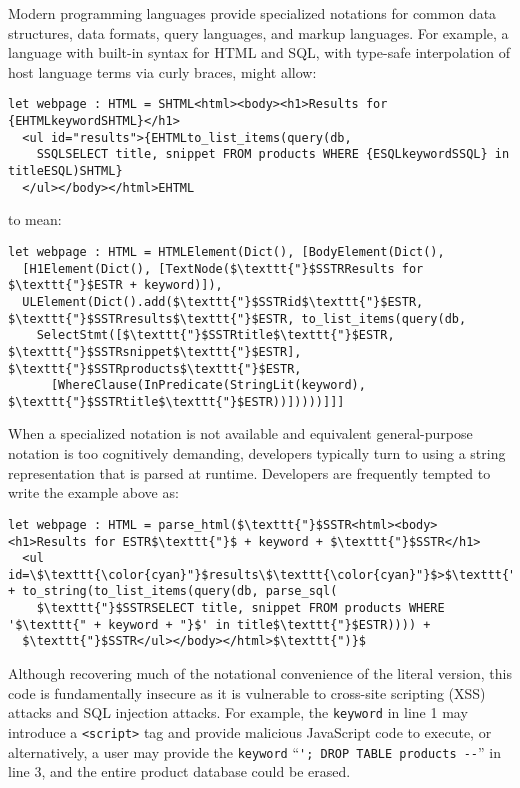 \documentclass{sig-alternate}
\let\li\lstinline
\begin{document}
Modern programming languages  provide specialized notations for common data structures, data formats, query languages, and markup languages. For example, a language with built-in syntax for HTML and SQL, with type-safe interpolation of host language terms via curly braces, might allow:

\begin{lstlisting}
let webpage : HTML = SHTML<html><body><h1>Results for {EHTMLkeywordSHTML}</h1>
  <ul id="results">{EHTMLto_list_items(query(db, 
    SSQLSELECT title, snippet FROM products WHERE {ESQLkeywordSSQL} in titleESQL)SHTML}
  </ul></body></html>EHTML
\end{lstlisting}

to mean:

\begin{lstlisting}
let webpage : HTML = HTMLElement(Dict(), [BodyElement(Dict(),
  [H1Element(Dict(), [TextNode($\texttt{"}$SSTRResults for $\texttt{"}$ESTR + keyword)]), 
  ULElement(Dict().add($\texttt{"}$SSTRid$\texttt{"}$ESTR, $\texttt{"}$SSTRresults$\texttt{"}$ESTR, to_list_items(query(db, 
    SelectStmt([$\texttt{"}$SSTRtitle$\texttt{"}$ESTR, $\texttt{"}$SSTRsnippet$\texttt{"}$ESTR], $\texttt{"}$SSTRproducts$\texttt{"}$ESTR, 
      [WhereClause(InPredicate(StringLit(keyword), $\texttt{"}$SSTRtitle$\texttt{"}$ESTR))]))))]]]
\end{lstlisting}

When a specialized notation is not available and equivalent general-purpose notation is too cognitively demanding, developers typically turn to using a string representation that is parsed at runtime. Developers are frequently  tempted to write the example above as:

\begin{lstlisting}
let webpage : HTML = parse_html($\texttt{"}$SSTR<html><body><h1>Results for ESTR$\texttt{"}$ + keyword + $\texttt{"}$SSTR</h1>
  <ul id=\$\texttt{\color{cyan}"}$results\$\texttt{\color{cyan}"}$>$\texttt{"}$ESTR + to_string(to_list_items(query(db, parse_sql(
  	$\texttt{"}$SSTRSELECT title, snippet FROM products WHERE '$\texttt{" + keyword + "}$' in title$\texttt{"}$ESTR)))) + 
  $\texttt{"}$SSTR</ul></body></html>$\texttt{")}$
\end{lstlisting}

Although recovering much of the notational convenience of the literal version, this code is fundamentally insecure as it is vulnerable to cross-site scripting (XSS) attacks and SQL injection attacks. For example, the \li{keyword} in line 1 may introduce a \li{<script>} tag and provide malicious JavaScript code to execute, or alternatively, a user may provide the \li{keyword} ``\li{'; DROP TABLE products --}'' in line 3, and the entire product database could be erased.
\end{document}
